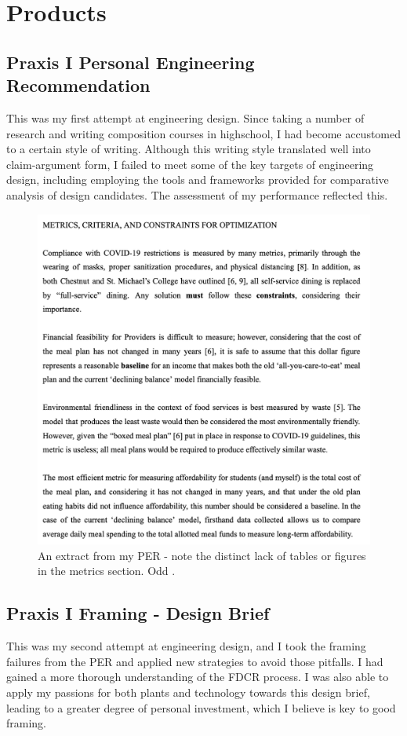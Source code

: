 \documentclass{report}
\begin{document}
\pagebreak
\section{Products}
\subsection{Praxis I Personal Engineering Recommendation}
This was my first attempt at engineering design. Since taking a number of 
research and writing composition courses in highschool, I had become accustomed 
to a certain style of writing. Although this writing style translated well 
into claim-argument form, I failed to meet some of the key targets of engineering 
design, including employing the tools and frameworks provided for comparative 
analysis of design candidates. The assessment of my performance reflected this.

\begin{figure}[h]
    \centering
    \includegraphics[width=\textwidth/2]{images/per.png}
    \hfill
    \caption{An extract from my PER - note the distinct lack of tables or figures in the metrics section. Odd \cite{per}.}
\end{figure}

\subsection{Praxis I Framing - Design Brief}
This was my second attempt at engineering design, and I took the framing 
failures from the PER and applied new strategies to avoid those pitfalls. 
I had gained a more thorough understanding of the FDCR process. I was also 
able to apply my passions for both plants and technology towards this design 
brief, leading to a greater degree of personal investment, which I believe 
is key to good framing.
\end{document}
